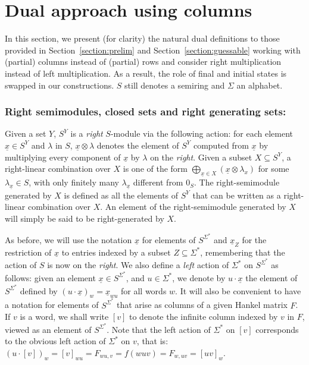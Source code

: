 \documentclass[10pt,a4paper]{amsart}
\theoremstyle{definition}
\numberwithin{equation}{section}
\numberwithin{theorem}{section}
\begin{document}
\newpage
\appendix

\section{Dual approach using columns}
\label{section:swap}

In this section, we present (for clarity) the natural dual definitions to those provided in Section~\ref{section:prelim} and Section~\ref{section:guessable} working with (partial) columns instead of (partial) rows and consider right multiplication instead of left multiplication. As a result, the role of final and initial states is swapped in our constructions. $S$ still denotes a semiring and $\Sigma$ an alphabet.

\subsubsection*{\textbf{Right semimodules, closed sets and right generating sets:}} Given a set $Y$, $S^Y$ is a \emph{right} $S$-module via the following action:  for each element $\underline{x} \in S^Y$ and $\lambda$ in $S$, $\underline{x} \otimes \lambda$ denotes the element of $S^Y$ computed from $\underline{x}$ by multiplying every component of $\underline{x}$ by $\lambda$ on the \emph{right}.  Given a subset $X \subseteq S^Y$, a right-linear combination over $X$ is one of the form $\bigoplus_{\underline{x} \in X} (\underline{x} \otimes \lambda_x)$ for some $\lambda_{\underline{x}} \in S$, with only finitely many $\lambda_{\underline{x}}$ different from $0_S$. The right-semimodule generated by $X$ is defined as all the elements of $S^Y$ that can be written as a right-linear combination over $X$. An element of the right-semimodule generated by $X$ will simply be said to be right-generated by $X$. 

As before, we will use the notation $\underline{x}$ for elements of $S^{\Sigma^*}$ and $\underline{x}_Z$ for the restriction of $\underline{x}$ to entries indexed by a subset $Z \subseteq \Sigma^*$, remembering that the action of $S$ is now on the \emph{right}. We also define a \emph{left} action of $\Sigma^*$ on $S^{\Sigma^*}$ as follows: given an element $\underline{x} \in S^{\Sigma^*}$, and $u \in \Sigma^*$, we denote by $u \cdot \underline{x}$ the element of $S^{\Sigma^*}$ defined by $(u\cdot \underline{x})_w = \underline{x}_{wu}$ for all words $w$. It will also be convenient to have a notation for elements of $S^{\Sigma^{*}}$ that arise as columns of a given Hankel matrix $F$. If $v$ is a word, we shall write $[ v ]$ to denote the infinite column indexed by $v$ in
$F$, viewed as an element of $S^{\Sigma^*}$. Note that the left action of $\Sigma^*$ on $[v]$ corresponds to the obvious left action of $\Sigma^*$ on $v$, that is: $(u \cdot [v])_w = [v]_{wu}= F_{wu,v} = f(wuv) = F_{w,uv} = [ uv ]_{w}$. 
\end{document}
